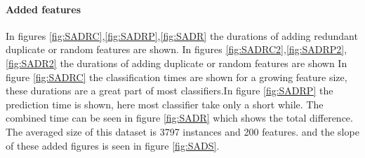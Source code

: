 \documentclass[a4paper,10pt]{article}
\begin{document}
\paragraph{Added features}
In figures \ref{fig:SADRC},\ref{fig:SADRP},\ref{fig:SADR} the durations of adding redundant duplicate or random features are shown. In figures \ref{fig:SADRC2},\ref{fig:SADRP2},\ref{fig:SADR2} the durations of adding duplicate or random features are shown In figure \ref{fig:SADRC} the classification times are shown for a growing feature size, these durations are a great part of most classifiers.In figure \ref{fig:SADRP} the prediction time is shown, here most classifier take only a short while. The combined time can be seen in figure \ref{fig:SADR} which shows the total difference.
The averaged size of this dataset is 3797 instances and 200 features.  and the slope of these added figures is seen in figure \ref{fig:SADS}.
\end{document}
